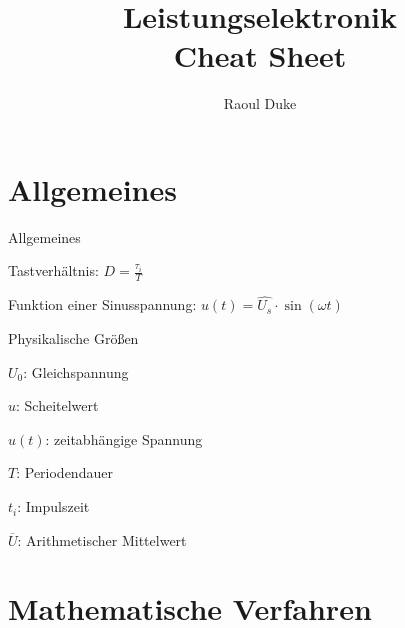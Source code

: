 \documentclass[german]{latex4ei/latex4ei_sheet}
\title{Leistungselektronik \\ Cheat Sheet}
\author{Raoul Duke}
\begin{document}
\maketitle   %

\section{Allgemeines}
	\begin{sectionbox}
		\begin{symbolbox}{Allgemeines}
			\item Tastverhältnis: $D = \frac{\tau_i}{T}$
			\item Funktion einer Sinusspannung: $u(t) = \hat{U_s} \cdot \sin(\omega t)$
		\end{symbolbox}
		\begin{bluebox}{Physikalische Größen}
			\item $U_0$: Gleichspannung
			\item $\hat{u}$: Scheitelwert
			\item $u(t)$: zeitabhängige Spannung
			\item $T$: Periodendauer
			\item $t_i$: Impulszeit
			\item $\overline{U}$: Arithmetischer Mittelwert
		\end{bluebox}
	\end{sectionbox}
\section{Mathematische Verfahren}
\end{document}
